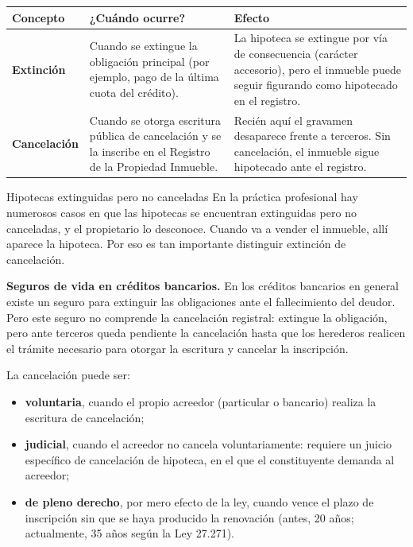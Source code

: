 \documentclass[12pt,oneside]{book}
\begin{document}
\begin{table}[H]
\centering
\begin{tabularx}{\textwidth}{@{}>{\raggedright\arraybackslash}p{}>{\raggedright\arraybackslash}p{}>{\raggedright\arraybackslash}X@{}}
\toprule
\textbf{Concepto} & \textbf{¿Cuándo ocurre?} & \textbf{Efecto} \\
\midrule
\textbf{Extinción} & Cuando se extingue la obligación principal (por ejemplo, pago de la última cuota del crédito). & La hipoteca se extingue por vía de consecuencia (carácter accesorio), pero el inmueble puede seguir figurando como hipotecado en el registro. \\
\textbf{Cancelación} & Cuando se otorga escritura pública de cancelación y se la inscribe en el Registro de la Propiedad Inmueble. & Recién aquí el gravamen desaparece frente a terceros. Sin cancelación, el inmueble sigue hipotecado ante el registro. \\
\bottomrule
\end{tabularx}
\end{table}

\begin{ejemplo}{Hipotecas extinguidas pero no canceladas}
En la práctica profesional hay numerosos casos en que las hipotecas se encuentran extinguidas pero no canceladas, y el propietario lo desconoce. Cuando va a vender el inmueble, allí aparece la hipoteca. Por eso es tan importante distinguir extinción de cancelación.
\end{ejemplo}

\begin{nota}
\textbf{Seguros de vida en créditos bancarios.} En los créditos bancarios en general existe un seguro para extinguir las obligaciones ante el fallecimiento del deudor. Pero este seguro no comprende la cancelación registral: extingue la obligación, pero ante terceros queda pendiente la cancelación hasta que los herederos realicen el trámite necesario para otorgar la escritura y cancelar la inscripción.
\end{nota}

La cancelación puede ser:
\begin{itemize}
    \item \textbf{voluntaria}, cuando el propio acreedor (particular o bancario) realiza la escritura de cancelación;
    \item \textbf{judicial}, cuando el acreedor no cancela voluntariamente: requiere un juicio específico de cancelación de hipoteca, en el que el constituyente demanda al acreedor;
    \item \textbf{de pleno derecho}, por mero efecto de la ley, cuando vence el plazo de inscripción sin que se haya producido la renovación (antes, 20 años; actualmente, 35 años según la Ley 27.271).
\end{itemize}
\end{document}

